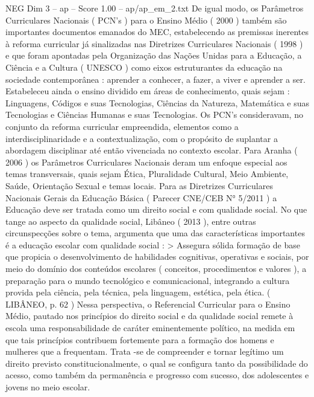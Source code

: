 \begin{textsample}{NEG Dim 3 – ap – Score 1.00 – ap/ap\_em\_2.txt}
De igual modo, os Parâmetros Curriculares Nacionais ( PCN’s ) para o Ensino Médio ( 2000 ) também são importantes documentos emanados do MEC, estabelecendo as premissas inerentes à reforma curricular já sinalizadas nas Diretrizes Curriculares Nacionais ( 1998 ) e que foram apontadas pela Organização das Nações Unidas para a Educação, a Ciência e a Cultura ( UNESCO ) como eixos estruturantes da educação na sociedade contemporânea : aprender a conhecer, a fazer, a viver e aprender a ser.
Estabeleceu ainda o ensino dividido em áreas de conhecimento, quais sejam : Linguagens, Códigos e suas Tecnologias, Ciências da Natureza, Matemática e suas Tecnologias e Ciências Humanas e suas Tecnologias.
Os PCN’s consideravam, no conjunto da reforma curricular empreendida, elementos como a interdisciplinaridade e a contextualização, com o propósito de suplantar a abordagem disciplinar até então vivenciada no contexto escolar.
Para Aranha ( 2006 ) os Parâmetros Curriculares Nacionais deram um enfoque especial aos temas transversais, quais sejam Ética, Pluralidade Cultural, Meio Ambiente, Saúde, Orientação Sexual e temas locais.
Para as Diretrizes Curriculares Nacionais Gerais da Educação Básica ( Parecer CNE/CEB N{\EmojiFont °} 5/2011 ) a Educação deve ser tratada como um direito social e com qualidade social.
No que tange ao aspecto da qualidade social, Libâneo ( 2013 ), entre outras circunspecções sobre o tema, argumenta que uma das características importantes é a educação escolar com qualidade social : > Assegura sólida formação de base que propicia o desenvolvimento de habilidades cognitivas, operativas e sociais, por meio do domínio dos conteúdos escolares ( conceitos, procedimentos e valores ), a preparação para o mundo tecnológico e comunicacional, integrando a cultura provida pela ciência, pela técnica, pela linguagem, estética, pela ética. ( LIBÂNEO, p. 62 ) Nessa perspectiva, o Referencial Curricular para o Ensino Médio, pautado nos princípios do direito social e da qualidade social remete à escola uma responsabilidade de caráter eminentemente político, na medida em que tais princípios contribuem fortemente para a formação dos homens e mulheres que a frequentam.
Trata -se de compreender e tornar legítimo um direito previsto constitucionalmente, o qual se configura tanto da possibilidade do acesso, como também da permanência e progresso com sucesso, dos adolescentes e jovens no meio escolar.

\end{textsample}
